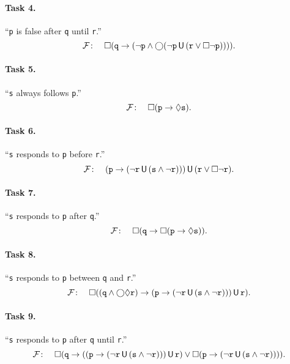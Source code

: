 \paragraph{Task 4.} ``\texttt{p} is false after \texttt{q} until \texttt{r}.''
$${\mathcal{F}}\colon\quad\Box (\texttt{q} \rightarrow (\neg \texttt{p} \wedge \bigcirc (\neg \texttt{p} \,\mathsf{U}\, (\texttt{r} \vee \Box \neg \texttt{p})))).$$

\paragraph{Task 5.} ``\texttt{s} always follows \texttt{p}.''
$${\mathcal{F}}\colon\quad\Box (\texttt{p} \rightarrow \Diamond \texttt{s}).$$

\paragraph{Task 6.} ``\texttt{s} responds to \texttt{p} before \texttt{r}.''
$${\mathcal{F}}\colon\quad(\texttt{p} \rightarrow (\neg \texttt{r} \,\mathsf{U}\, (\texttt{s} \wedge \neg \texttt{r}))) \,\mathsf{U}\, (\texttt{r} \vee \Box \neg \texttt{r}).$$

\paragraph{Task 7.} ``\texttt{s} responds to \texttt{p} after \texttt{q}.''
$${\mathcal{F}}\colon\quad\Box (\texttt{q} \rightarrow \Box (\texttt{p} \rightarrow \Diamond \texttt{s})).$$

\paragraph{Task 8.} ``\texttt{s} responds to \texttt{p} between \texttt{q} and \texttt{r}.''
$${\mathcal{F}}\colon\quad\Box ((\texttt{q} \wedge \bigcirc \Diamond \texttt{r}) \rightarrow (\texttt{p} \rightarrow (\neg \texttt{r} \,\mathsf{U}\, (\texttt{s} \wedge \neg \texttt{r}))) \,\mathsf{U}\, \texttt{r}).$$

\paragraph{Task 9.} ``\texttt{s} responds to \texttt{p} after \texttt{q} until \texttt{r}.''
$${\mathcal{F}}\colon\quad\Box (\texttt{q} \rightarrow ((\texttt{p} \rightarrow (\neg \texttt{r} \,\mathsf{U}\, (\texttt{s} \wedge \neg \texttt{r}))) \,\mathsf{U}\, \texttt{r}) \vee \Box (\texttt{p} \rightarrow (\neg \texttt{r} \,\mathsf{U}\, (\texttt{s} \wedge \neg \texttt{r})))).$$


